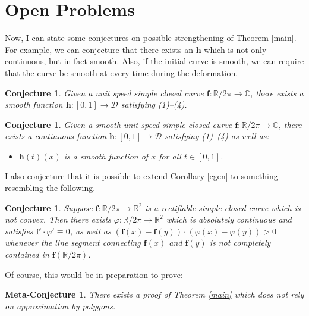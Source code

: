 \documentclass{amsart}
\newcommand{\C}			{\mathbb C}
\newcommand{\R}			{\mathbb R}
\newcommand{\f}			{\mathbf f}
\newcommand{\h}			{\mathbf h}
\newcommand{\map}		{\longrightarrow}
\newtheorem{conjecture}[theorem]{Conjecture}
\newtheorem{mconjecture}[theorem]{Meta-Conjecture}
\numberwithin{equation}{section}
\begin{document}
\section{Open Problems}

Now, I can state some conjectures on possible strengthening 
of Theorem \ref{main}.  For example, we can 
conjecture that there exists an $\h$ which is not only 
continuous, but in fact smooth.  Also, if the initial curve is 
smooth, we can require that the curve be smooth at every 
time during the deformation.

\begin{conjecture}
Given a unit speed simple closed curve $\f:\R/2\pi\map\C$, 
there exists a smooth function $\h:[0,1]\map\mathcal D$ satisfying 
(1)--(4).
\end{conjecture}

\begin{conjecture}
Given a smooth unit speed simple closed curve $\f:\R/2\pi\map\C$, 
there exists a continuous function $\h:[0,1]\map\mathcal D$ satisfying 
(1)--(4) as well as:
\begin{itemize}
\item[(5)] $\h(t)(x)$ is a smooth function of $x$ for all $t\in[0,1]$.
\end{itemize}
\end{conjecture}

I also conjecture that it is possible to extend Corollary \ref{cgen} 
to something resembling the following.

\begin{conjecture}
Suppose $\f:\R/2\pi\map\R^2$ is a rectifiable simple closed 
curve which is not convex.  Then there exists 
$\varphi:\R/2\pi\map\R^2$ which is absolutely continuous and 
satisfies $\f'\cdot\varphi'\equiv 0$, as well as 
$(\f(x)-\f(y))\cdot(\varphi(x)-\varphi(y))>0$ whenever the 
line segment connecting $\f(x)$ and $\f(y)$ is not 
completely contained in $\f(\R/2\pi)$.
\end{conjecture}

Of course, this would be in preparation to prove:

\begin{mconjecture}
There exists a proof of Theorem \ref{main} which does not rely 
on approximation by polygons.
\end{mconjecture}



\end{document}
